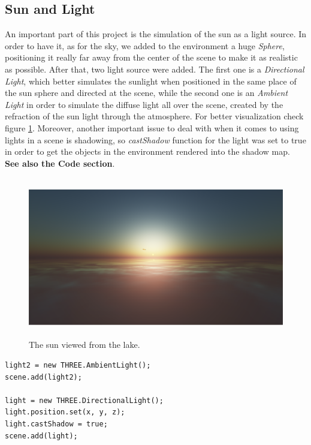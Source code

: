 \documentclass[paper=a4, fontsize=11pt]{scrartcl} %
\numberwithin{equation}{section} %
\numberwithin{figure}{section} %
\numberwithin{table}{section} %
\begin{document}
\newpage

\subsection{Sun and Light}

An important part of this project is the simulation of the sun as a light source. In order to have it, as for the sky, we added to the environment a huge \textit{Sphere}, positioning it really far away from the center of the scene to make it as realistic as possible.  After that, two light source were added. The first one is a \textit{Directional Light}, which better simulates the sunlight when positioned in the same place of the sun sphere and directed at the scene, while the second one is an \textit{Ambient Light} in order to simulate the diffuse light all over the scene, created by the refraction of the sun light through the atmosphere. For better visualization check figure \ref{sun}. Moreover, another important issue to deal with when it comes to using lights in a scene is shadowing, so \textit{castShadow} function for the light was set to true in order to get the objects in the environment rendered into the shadow map.  \textbf{See also the Code section}.

\begin{figure}[!ht]
\centering
\includegraphics[width=15cm, height=7cm]{images/sun.png}
\caption{The sun viewed from the lake.}
\label{sun}
\end{figure}

\begin{verbatim}
light2 = new THREE.AmbientLight(); 
scene.add(light2);

light = new THREE.DirectionalLight();
light.position.set(x, y, z);
light.castShadow = true;
scene.add(light);
\end{verbatim}
\end{document}
